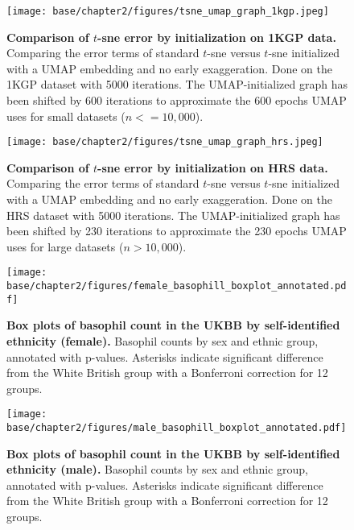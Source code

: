 \begin{figure}[!htb]
    \centering
    \texttt{[image: base/chapter2/figures/tsne\_umap\_graph\_1kgp.jpeg]}
    \caption[Comparison of $t$-sne error by initialization on 1KGP data]{\textbf{Comparison of $t$-sne error by initialization on 1KGP data.} Comparing the error terms of standard $t$-sne versus $t$-sne initialized with a UMAP embedding and no early exaggeration. Done on the 1KGP dataset with 5000 iterations. The UMAP-initialized graph has been shifted by 600 iterations to approximate the 600 epochs UMAP uses for small datasets ($n<=10,000$).}
    \label{fig:supp_tsne_umap_compare_1kgp_graph}
\end{figure}

\newpage

\begin{figure}[!htb]
    \centering
    \texttt{[image: base/chapter2/figures/tsne\_umap\_graph\_hrs.jpeg]}
    \caption[Comparison of $t$-sne error by initialization on HRS data]{\textbf{Comparison of $t$-sne error by initialization on HRS data.} Comparing the error terms of standard $t$-sne versus $t$-sne initialized with a UMAP embedding and no early exaggeration. Done on the HRS dataset with 5000 iterations. The UMAP-initialized graph has been shifted by 230 iterations to approximate the 230 epochs UMAP uses for large datasets ($n>10,000$).}
    \label{fig:supp_tsne_umap_compare_hrs_graph}
\end{figure}

\newpage

\begin{figure}[ht]
    \centering
    \texttt{[image: base/chapter2/figures/female\_basophill\_boxplot\_annotated.pdf]}
    \caption[Box plots of basophil count in the UKBB by self-identified ethnicity (female)]{\textbf{Box plots of basophil count in the UKBB by self-identified ethnicity (female).} Basophil counts by sex and ethnic group, annotated with p-values. Asterisks indicate significant difference from the White British group with a Bonferroni correction for 12 groups.}
    \label{fig:supp_box_basophill_f}
\end{figure}

\newpage

\begin{figure}[ht]
    \centering
    \texttt{[image: base/chapter2/figures/male\_basophill\_boxplot\_annotated.pdf]}
    \caption[Box plots of basophil count in the UKBB by self-identified ethnicity (male)]{\textbf{Box plots of basophil count in the UKBB by self-identified ethnicity (male).} Basophil counts by sex and ethnic group, annotated with p-values. Asterisks indicate significant difference from the White British group with a Bonferroni correction for 12 groups.}
    \label{fig:supp_box_basophill_m}
\end{figure}

